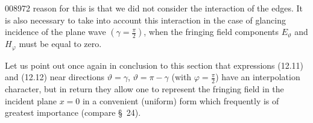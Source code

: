 \begin{scanpage}{0089}{72}
reason for this is that we did not consider the interaction of the edges. It is also necessary to take into account this interaction in the case of glancing incidence of the plane wave $(\gamma=\frac\pi2)$, when the fringing field components $E_\vartheta$ and $H_\varphi$ must be equal to zero.

Let us point out once again in conclusion to this section that expressions (12.11) and (12.12) near directions $\vartheta=\gamma$, $\vartheta=\pi-\gamma$ (with $\varphi=\frac\pi2$) have an interpolation character, but in return they allow one to represent the fringing field in the incident plane $x=0$ in a convenient (uniform) form which frequently is of greatest importance (compare \S\ 24).
\end{scanpage}
